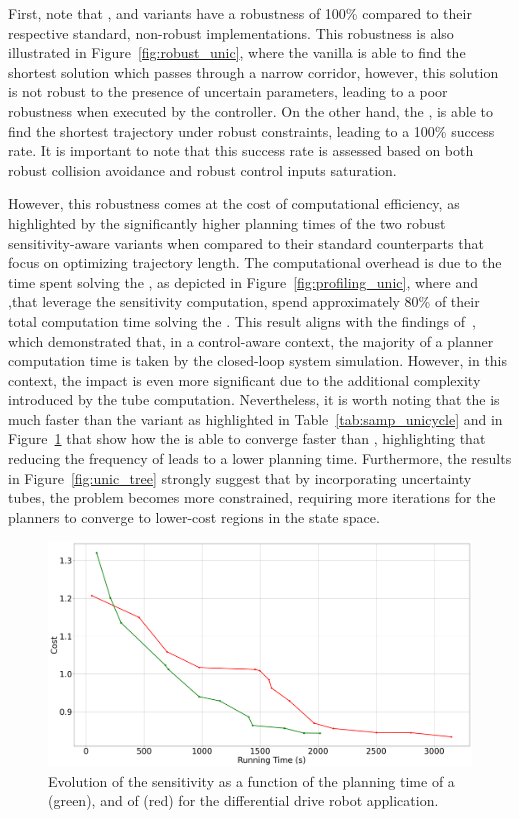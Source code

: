 First, note that , and  variants have a robustness of 100\% compared to their respective standard, non-robust implementations.
This robustness is also illustrated in Figure~\ref{fig:robust_unic}, where the vanilla  is able to find the shortest solution which passes through a narrow corridor, however, this solution is not robust to the presence of uncertain parameters, leading to a poor robustness when executed by the controller.
On the other hand, the , is able to find the shortest trajectory under robust constraints, leading to a 100\% success rate.
It is important to note that this success rate is assessed based on both robust collision avoidance and robust control inputs saturation.

However, this robustness comes at the cost of computational efficiency, as highlighted by the significantly higher planning times of the two robust sensitivity-aware variants when compared to their standard counterparts that focus on optimizing trajectory length.
The computational overhead is due to the time spent solving the , as depicted in Figure~\ref{fig:profiling_unic}, where  and  ,that leverage the sensitivity computation, spend approximately 80\% of their total computation time solving the . 
This result aligns with the findings of~\cite{cTognon}, which demonstrated that, in a control-aware context, the majority of a planner computation time is taken by the closed-loop system simulation.
However, in this context, the impact is even more significant due to the additional complexity introduced by the tube computation.
Nevertheless, it is worth noting that the  is much faster than the  variant as highlighted in Table~\ref{tab:samp_unicycle} and in Figure~\ref{fig:samp_unic_time} that show how the  is able to converge faster than , highlighting that reducing the frequency of  leads to a lower planning time.
Furthermore, the results in Figure~\ref{fig:unic_tree} strongly suggest that by incorporating uncertainty tubes, the problem becomes more constrained, requiring more iterations for the planners to converge to lower-cost regions in the state space.

\begin{figure} [H]
    \centering
    \includegraphics[width=0.6\linewidth]{figures/samp/unicycle_cost_conv.png} 
    \caption{Evolution of the sensitivity as a function of the planning time of a  (green), and of  (red) for the differential drive robot application.}%
    \label{fig:samp_unic_time}%
\end{figure}

